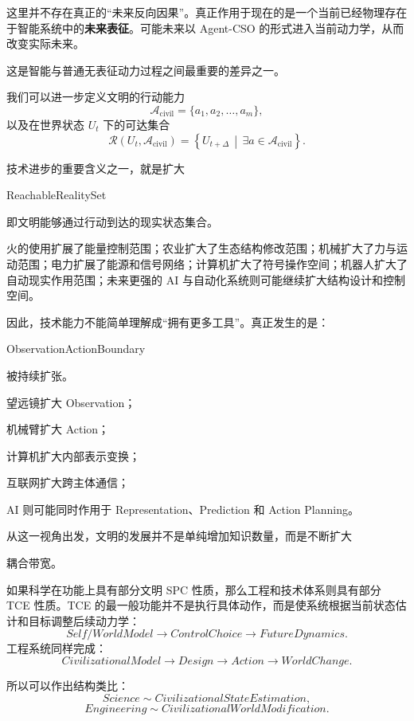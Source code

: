 这里并不存在真正的“未来反向因果”。真正作用于现在的是一个当前已经物理存在于智能系统中的\textbf{未来表征}。可能未来以 Agent-CSO 的形式进入当前动力学，从而改变实际未来。

这是智能与普通无表征动力过程之间最重要的差异之一。

我们可以进一步定义文明的行动能力
\[
\mathcal{A}_{\mathrm{civil}}
=
\{a_1,a_2,\ldots,a_m\},
\]
以及在世界状态 $U_t$ 下的可达集合
\[
\mathcal{R}(U_t,\mathcal{A}_{\mathrm{civil}})
=
\left\{
U_{t+\Delta}
\,\middle|\,
\exists a\in\mathcal{A}_{\mathrm{civil}}
\right\}.
\]

技术进步的重要含义之一，就是扩大
\begin{statementbox}
ReachableRealitySet
\end{statementbox}
即文明能够通过行动到达的现实状态集合。

火的使用扩展了能量控制范围；农业扩大了生态结构修改范围；机械扩大了力与运动范围；电力扩展了能源和信号网络；计算机扩大了符号操作空间；机器人扩大了自动现实作用范围；未来更强的 AI 与自动化系统则可能继续扩大结构设计和控制空间。

因此，技术能力不能简单理解成“拥有更多工具”。真正发生的是：
\begin{statementbox}
ObservationActionBoundary
\end{statementbox}
被持续扩张。

望远镜扩大 Observation；

机械臂扩大 Action；

计算机扩大内部表示变换；

互联网扩大跨主体通信；

AI 则可能同时作用于 Representation、Prediction 和 Action Planning。

从这一视角出发，文明的发展并不是单纯增加知识数量，而是不断扩大
\begin{statementbox}
\centering
{}
\end{statementbox}
耦合带宽。

如果科学在功能上具有部分文明 SPC 性质，那么工程和技术体系则具有部分 TCE 性质。TCE 的最一般功能并不是执行具体动作，而是使系统根据当前状态估计和目标调整后续动力学：
\[
Self/WorldModel
\rightarrow
ControlChoice
\rightarrow
FutureDynamics.
\]
工程系统同样完成：
\[
CivilizationalModel
\rightarrow
Design
\rightarrow
Action
\rightarrow
WorldChange.
\]

所以可以作出结构类比：
\[
Science
\sim
CivilizationalStateEstimation,
\]
\[
Engineering
\sim
CivilizationalWorldModification.
\]

